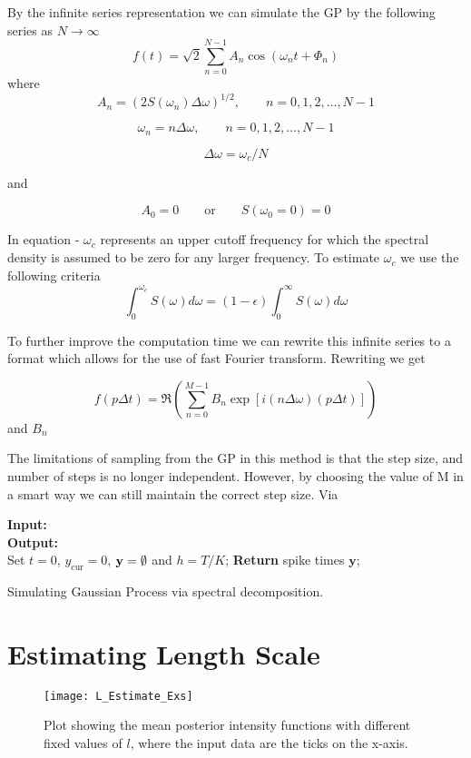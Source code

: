 \documentclass[../main.tex]{subfiles}
\begin{document}
By the infinite series representation we can simulate the GP by the following series as $N \rightarrow \infty$
$$
f(t) = \sqrt{2}\sum^{N-1}_{n=0} A_n \cos(\omega_n t + \Phi_n)
$$
where
$$
A_n = \left( 2 S(\omega_n) \Delta \omega \right)^{1/2}, \qquad n=0,1,2,\dots,N-1
$$

$$
\omega_n = n\Delta \omega , \qquad n=0,1,2,\dots,N-1
$$

$$
\Delta \omega = \omega_c / N
$$

and

$$
A_0 = 0 \qquad \text{or} \qquad S(\omega_0 = 0) =0
$$

In equation - $\omega_c$ represents an upper cutoff frequency for which the spectral density is assumed to be zero for any larger frequency. To estimate $\omega_c$ we use the following criteria 
$$
\int^{\omega_c}_0 S(\omega) d\omega = \left( 1 - \epsilon \right) \int^{\infty}_0 S(\omega) d\omega
$$

To further improve the computation time we can rewrite this infinite series to a format which allows for the use of fast Fourier transform. Rewriting we get

$$
f(p \Delta t) = \Re \left( \sum^{M-1}_{n=0} B_n \exp \left[i (n\Delta \omega ) (p \Delta t) \right] \right)
$$
and $B_n$ 

The limitations of sampling from the GP in this method is that the step size, and number of steps is no longer independent. However, by choosing the value of M in a smart way we can still maintain the correct step size. Via 

\begin{algorithm}[t]
\DontPrintSemicolon
\textbf{Input:}\\ 
\textbf{Output:}\\
\vspace{0.3cm}
Set $t=0$, $y_{\mathrm{cur}} = 0$, $\mathbf{y} = \emptyset$ and $h = T/K$; \;
\textbf{Return} spike times $\mathbf{y}$; \;
\caption{Simulating Gaussian Process via spectral decomposition.}
\end{algorithm}


\section{Estimating Length Scale}
\begin{figure}[t]
	\texttt{[image: L\_Estimate\_Exs]}
	\caption{Plot showing the mean posterior intensity functions with different fixed values of $l$, where the input data are the ticks on the x-axis.}
	\label{fig: LEstimate_EqualLikeli}
\end{figure}
\end{document}
